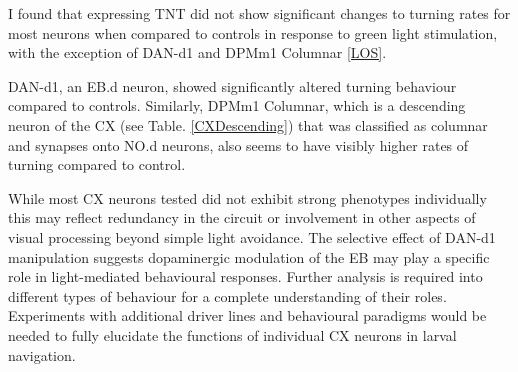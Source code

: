      \begin{table}[H]
    \centering
    \caption[Neurons tested for LOF]{ \textbf{Neurons tested for LOF} Neuron names, corresponding split GAL4 line used for LOF experiments, and lineage information.}
    \label{TNTlines}
    \end{table}

    I found that expressing TNT did not show significant changes to turning rates for most neurons when compared to controls in response to green light stimulation, with the exception of DAN-d1 and DPMm1 Columnar \ref{LOS}. 

    DAN-d1, an EB.d neuron, showed significantly altered turning behaviour compared to controls. 
    Similarly, DPMm1 Columnar, which is a descending neuron of the CX (see Table. \ref{CXDescending}) that was classified as columnar and synapses onto NO.d neurons,  also seems to have visibly higher rates of turning compared to control. 
    
    While most CX neurons tested did not exhibit strong phenotypes individually this may reflect redundancy in the circuit or involvement in other aspects of visual processing beyond simple light avoidance. The selective effect of DAN-d1 manipulation suggests dopaminergic modulation of the EB may play a specific role in light-mediated behavioural responses. Further analysis is required into different types of behaviour for a complete understanding of their roles. Experiments with additional driver lines and behavioural paradigms would be needed to fully elucidate the functions of individual CX neurons in larval navigation.


